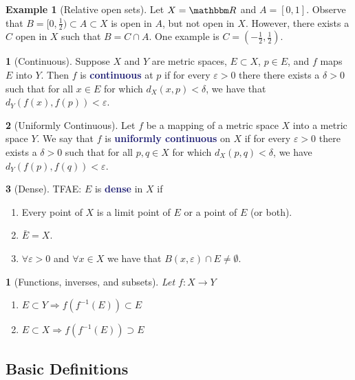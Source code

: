 \documentclass[12pt]{article}
\numberwithin{equation}{section}
\newcommand{\navy}[1]{\textcolor{MidnightBlue}{\bf #1}}
\theoremstyle{plain}
\newtheorem{theorem}{\color{ForestGreen}{\textbf{Theorem}}}[section]
\theoremstyle{definition}
\newtheorem{definition}{\color{MidnightBlue}{\textbf{Definition}}}[section]
\newtheorem{example}{\color{WildStrawberry}Example}[section]
\newcommand\inv[1]{#1^{-1}}
\def\imp{\Rightarrow}
\newcommand{\1}{\mathbbm 1}
\def\d{\delta}
\newcommand{\e}{\varepsilon}
\newcommand{\RR}{\mathbbm R}
\begin{document}
\begin{example}[Relative open sets]
	Let $X = \RR$ and $A = [0,1]$. Observe that $B = [0,\frac{1}{2}) \subset A \subset X$ is open in $A$, but not open in $X$. However, there exists a $C$ open in $X$ such that $B = C \cap A$. One example is $C = (-\frac{1}{2}, \frac{1}{2})$.
\end{example}	


\begin{definition}[Continuous]
	Suppose $X$ and $Y$ are metric spaces, $E \subset X$, $p \in E$, and $f$ maps $E$ into $Y$. Then $f$ is \navy{continuous} at $p$ if for every $\e > 0$ there there exists a $\d > 0$ such that for all $x \in E$ for which $d_X(x,p) < \d$, we have that $d_Y(f(x), f(p)) < \e$. 
\end{definition}

\begin{definition}[Uniformly Continuous]
	Let $f$ be a mapping of a metric space $X$ into a metric space $Y$. We say that $f$ is \navy{uniformly continuous} on $X$ if for every $\e > 0$ there exists a $\d > 0$ such that for all $p,q \in X$ for which $d_X(p,q) < \delta$, we have $d_Y(f(p),f(q)) < \e$. 
\end{definition}

\begin{definition}[Dense] TFAE: $E$ is \navy{dense} in $X$ if
\begin{enumerate}
	\item  Every point of $X$ is a limit point of $E$ or a point of $E$ (or both). 
	\item $\bar{E} = X$.
	\item $\forall \e > 0$ and $\forall x \in X$ we have that $B(x,\e) \cap E \neq \emptyset$.
\end{enumerate} 
\end{definition}

\begin{theorem}[Functions, inverses, and subsets]
	Let $f: X \to Y$
	\begin{enumerate}
		\item $E \subset Y \imp f(\inv{f}(E)) \subset E$ 
		\item $E \subset X \imp f(\inv{f}(E)) \supset E$
	\end{enumerate}
\end{theorem}



\subsection{Basic Definitions}
\end{document}
